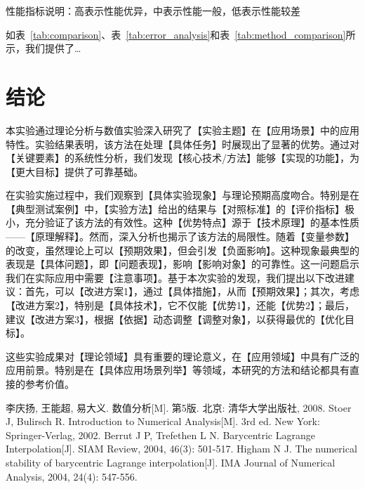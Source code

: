 \documentclass{joulabreport}
\begin{document}
{\begin{table}[h]
\begin{tabular}{
    l
    >{\raggedright\arraybackslash}p{4cm}
    >{\raggedright\arraybackslash}p{3cm}
    >{\centering\arraybackslash}p{2cm}
    >{\centering\arraybackslash}p{2cm}
}
\bottomrule
\end{tabular}
\begin{tablenotes}
\small
\item 性能指标说明：高表示性能优异，中表示性能一般，低表示性能较差
\end{tablenotes}
\end{table}

如表~\ref{tab:comparison}、表~\ref{tab:error_analysis}和表~\ref{tab:method_comparison}所示，我们提供了\dots

\section{结论}
本实验通过理论分析与数值实验深入研究了【实验主题】在【应用场景】中的应用特性。实验结果表明，该方法在处理【具体任务】时展现出了显著的优势。通过对【关键要素】的系统性分析，我们发现【核心技术/方法】能够【实现的功能】，为【更大目标】提供了可靠基础。

在实验实施过程中，我们观察到【具体实验现象】与理论预期高度吻合。特别是在【典型测试案例】中，【实验方法】给出的结果与【对照标准】的【评价指标】极小，充分验证了该方法的有效性。这种【优势特点】源于【技术原理】的基本性质——【原理解释】。然而，深入分析也揭示了该方法的局限性。随着【变量参数】的改变，虽然理论上可以【预期效果】，但会引发【负面影响】。这种现象最典型的表现是【具体问题】，即【问题表现】，影响【影响对象】的可靠性。这一问题启示我们在实际应用中需要【注意事项】。基于本次实验的发现，我们提出以下改进建议：首先，可以【改进方案1】，通过【具体措施】，从而【预期效果】；其次，考虑【改进方案2】，特别是【具体技术】，它不仅能【优势1】，还能【优势2】；最后，建议【改进方案3】，根据【依据】动态调整【调整对象】，以获得最优的【优化目标】。

这些实验成果对【理论领域】具有重要的理论意义，在【应用领域】中具有广泛的应用前景。特别是在【具体应用场景列举】等领域，本研究的方法和结论都具有直接的参考价值。

\begin{thebibliography}{4}
 李庆扬, 王能超, 易大义. 数值分析[M]. 第5版. 北京: 清华大学出版社, 2008.
 Stoer J, Bulirsch R. Introduction to Numerical Analysis[M]. 3rd ed. New York: Springer-Verlag, 2002.
 Berrut J P, Trefethen L N. Barycentric Lagrange Interpolation[J]. SIAM Review, 2004, 46(3): 501-517.
 Higham N J. The numerical stability of barycentric Lagrange interpolation[J]. IMA Journal of Numerical Analysis, 2004, 24(4): 547-556.
\end{thebibliography}

} %
\end{document}
